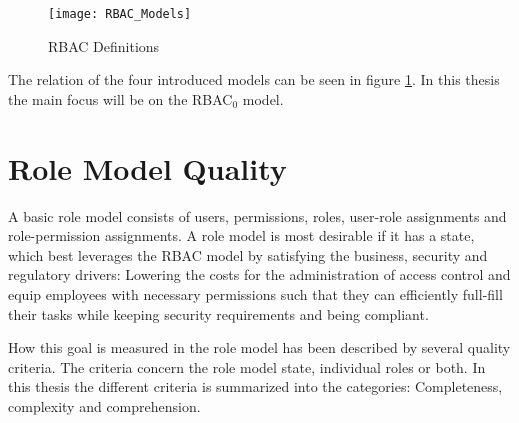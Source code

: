     \begin{figure}[H]
        \centering
        \texttt{[image: RBAC\_Models]}
        \caption{RBAC Definitions\cite{tassey2002economic}}
        \label{fig:rbacmodels}
    \end{figure}
    
    The relation of the four introduced models can be seen in figure \ref{fig:rbacmodels}. In this thesis the main focus will be on the RBAC$_0$ model.
    \iffalse Like in Vaidya et al.\cite{Vaidya:2007} and Frank et al.\cite{Frank:2013} sessions will not be considered for simplicity reasons.
    The NIST RBAC model \cite{sandhu2000nist} distinguished between four levels of RBAC models: Flat, Hierarchical, Constrained and Symmetric RBAC. Each level introduces an additional functional capability to the previous level. In terms of the NIST RBAC model the Flat RBAC model will be the focus of the thesis.\fi
    
    \section{Role Model Quality}
    \label{sec:rmQuality}
    A basic role model consists of users, permissions, roles, user-role assignments and role-permission assignments. A role model is most desirable if it has a state, which best leverages the RBAC model by satisfying the business, security and regulatory drivers: Lowering the costs for the administration of access control and equip employees with necessary permissions such that they can efficiently full-fill their tasks while keeping security requirements and being compliant.
    
    How this goal is measured in the role model has been described by several quality criteria\cite{Kunz}\cite{Frank}. The criteria concern the role model state, individual roles or both. In this thesis the different criteria is summarized into the categories: Completeness, complexity and comprehension.

